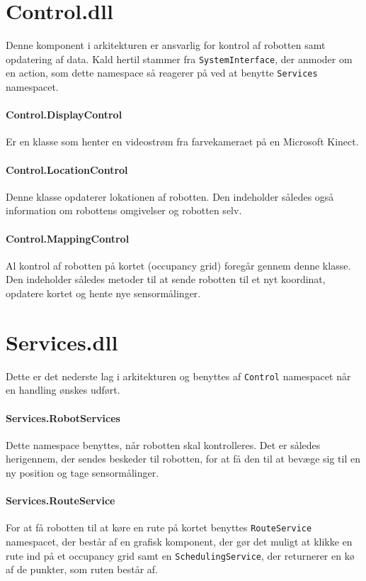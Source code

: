 \section{Control.dll}\label{arkitektur:control}
Denne komponent i arkitekturen er ansvarlig for kontrol af robotten samt opdatering af data.
Kald hertil stammer fra \lstinline[style=csharp]!SystemInterface!, der anmoder om en action, som dette namespace så reagerer på ved at benytte \lstinline[style=csharp]!Services! namespacet.

\paragraph{Control.DisplayControl}
Er en klasse som henter en videostrøm fra farvekameraet på en Microsoft Kinect.

\paragraph{Control.LocationControl}
Denne klasse opdaterer lokationen af robotten.
Den indeholder således også information om robottens omgivelser og robotten selv.

\paragraph{Control.MappingControl}
Al kontrol af robotten på kortet (occupancy grid) foregår gennem denne klasse.
Den indeholder således metoder til at sende robotten til et nyt koordinat, opdatere kortet og hente nye sensormålinger.

\section{Services.dll}\label{arkitektur:services}
Dette er det nederste lag i arkitekturen og benyttes af \lstinline[style=csharp]!Control! namespacet når en handling ønskes udført.

\paragraph{Services.RobotServices}
Dette namespace benyttes, når robotten skal kontrolleres.
Det er således herigennem, der sendes beskeder til robotten, for at få den til at bevæge sig til en ny position og tage sensormålinger.

\paragraph{Services.RouteService}
For at få robotten til at køre en rute på kortet benyttes \lstinline[style=csharp]!RouteService! namespacet, der består af en grafisk komponent, der gør det muligt at klikke en rute ind på et occupancy grid samt en \lstinline[style=csharp]|SchedulingService|, der returnerer en kø af de punkter, som ruten består af.

